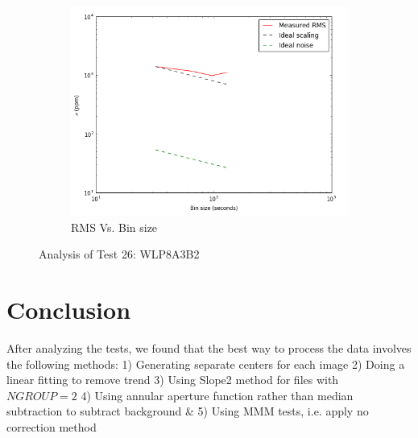 \documentclass[conference]{IEEEtran}
\begin{document}
\begin{figure}[H]
    \begin{subfigure}{3}
        \includegraphics[scale=0.6]{rms_test26}
        \caption{RMS Vs. Bin size}
    \end{subfigure}
    \caption{Analysis of Test 26: WLP8A3B2}
\end{figure}



\section{Conclusion}
After analyzing the tests, we found that the best way to process the data involves the following methods: 1) Generating separate centers for each image 2) Doing a linear fitting to remove trend 3) Using Slope2 method for files with $NGROUP = 2$ 4) Using annular aperture function rather than median subtraction to subtract background \& 5) Using MMM tests, i.e. apply no correction method  
\end{document}
